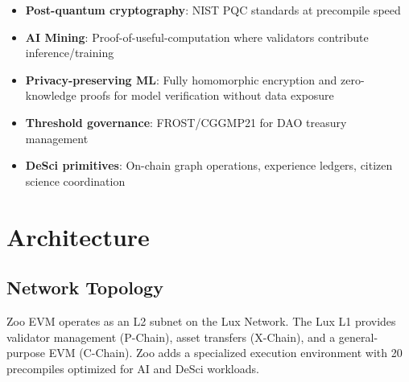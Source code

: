 \documentclass[11pt,a4paper]{article}
\begin{document}
\begin{itemize}[nosep]
  \item \textbf{Post-quantum cryptography}: NIST PQC standards at precompile speed
  \item \textbf{AI Mining}: Proof-of-useful-computation where validators contribute inference/training
  \item \textbf{Privacy-preserving ML}: Fully homomorphic encryption and zero-knowledge proofs for model verification without data exposure
  \item \textbf{Threshold governance}: FROST/CGGMP21 for DAO treasury management
  \item \textbf{DeSci primitives}: On-chain graph operations, experience ledgers, citizen science coordination
\end{itemize}

\section{Architecture}

\subsection{Network Topology}

Zoo EVM operates as an L2 subnet on the Lux Network. The Lux L1 provides validator management (P-Chain), asset transfers (X-Chain), and a general-purpose EVM (C-Chain). Zoo adds a specialized execution environment with 20 precompiles optimized for AI and DeSci workloads.

\begin{center}
\end{center}
\end{document}
